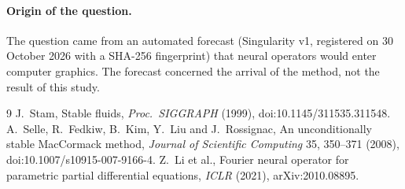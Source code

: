 \documentclass[11pt]{article}
\begin{document}
\paragraph{Origin of the question.} The question came from an automated forecast (Singularity v1, registered on 30
October 2026 with a SHA-256 fingerprint) that neural operators would enter computer graphics. The forecast concerned
the arrival of the method, not the result of this study.

\begin{thebibliography}{9}
 J.~Stam, Stable fluids, \emph{Proc.\ SIGGRAPH} (1999), doi:10.1145/311535.311548.
 A.~Selle, R.~Fedkiw, B.~Kim, Y.~Liu and J.~Rossignac, An unconditionally stable MacCormack method,
\emph{Journal of Scientific Computing} 35, 350--371 (2008), doi:10.1007/s10915-007-9166-4.
 Z.~Li et al., Fourier neural operator for parametric partial differential equations, \emph{ICLR} (2021),
arXiv:2010.08895.
\end{thebibliography}
\end{document}

